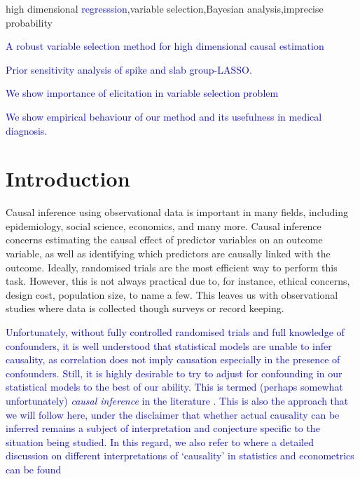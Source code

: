 \documentclass[preprint,12pt]{elsarticle}
\newcommand{\added}[1]{\textcolor{blue}{#1}}
\begin{document}
\begin{frontmatter}
\begin{keyword}
  high dimensional \added{regresssion}\sep variable selection\sep Bayesian analysis\sep imprecise probability
\end{keyword}

\begin{highlights}
\item \added{A robust variable selection method for high dimensional causal estimation} 

\item \added{Prior sensitivity analysis of spike and slab group-LASSO.} 

\item \added{We show importance of elicitation in variable
selection problem}

\item \added{We show empirical behaviour of our method and
its usefulness in medical diagnosis.}

\end{highlights}

\end{frontmatter}
\section{Introduction}\label{sec:intro}

Causal inference using observational data is important in
many fields, including epidemiology, social science, economics, and many more.
Causal inference concerns estimating the causal
effect of predictor variables on an outcome variable,
as well as identifying which predictors are causally linked with the outcome.
Ideally,
randomised trials are the most efficient way to perform this task.
However, this is not always practical due to, for instance, ethical 
concerns, design cost, population size, to name a few. This
leaves us with observational studies
where data is collected though surveys or record keeping.

\added{%
Unfortunately, without fully controlled randomised trials and full
knowledge of confounders, it is well understood that
statistical models are unable to infer causality, as correlation
does not imply causation especially in the presence of confounders.
Still, it is highly desirable to try to adjust for confounding in
our statistical models to the best of our ability. This is termed
(perhaps somewhat unfortunately) \emph{causal inference} in the
literature
\citep{rubin1978,rosenbaum83,Robins1986ANA,winship99,stuart10,Zigler2014,wang2015,koch2018,Hahn2018,koch2020}. 
This is also the approach that we will follow here, under the
disclaimer that whether actual causality can be inferred
remains a subject of interpretation and conjecture specific to the
situation being studied. In this regard, we also refer to \citep{imbiens_2022}
where a detailed discussion on different interpretations of `causality'
in statistics and econometrics can be found 
}
\end{document}
